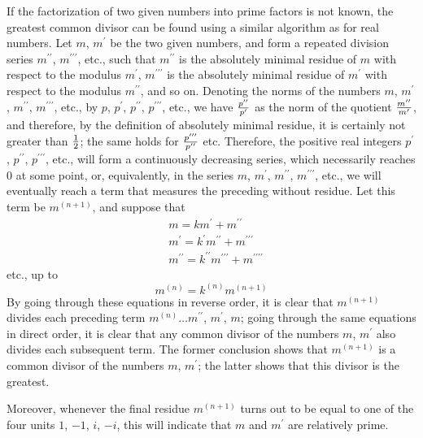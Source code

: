 \documentclass[twoside,12pt]{memoir}
\let\oldfrac\frac
\def\frac#1#2{\mathchoice{\tfrac{#1}{#2}}{\oldfrac{#1}{#2}}{\genfrac{}{}{}{2}{#1}{#2\mathstrut}}{\genfrac{}{}{}{3}{#1}{#2\mathstrut}}}
\begin{document}
If the factorization of two given numbers into prime factors is not known, the greatest common divisor can be found using a similar algorithm as for real numbers. Let \(m\), \(m^{\prime}\) be the two given numbers, and form a repeated division series \(m^{\prime \prime}\), \(m^{\prime \prime \prime}\), etc., such that \(m^{\prime \prime}\) is the absolutely minimal residue of \(m\) with respect to the modulus \(m^{\prime}\), \(m^{\prime \prime \prime}\) is the absolutely minimal residue of \(m^{\prime}\) with respect to the modulus \(m^{\prime \prime}\), and so on. Denoting the norms of the numbers \(m\), \(m^{\prime}\), \(m^{\prime \prime}\), \(m^{\prime \prime \prime}\), etc., by \(p\), \(p^{\prime}\), \(p^{\prime \prime}\), \(p^{\prime \prime \prime}\), etc., we have \(\frac{p^{\prime \prime}}{p^{\prime}}\) as the norm of the quotient \(\frac{m^{\prime \prime}}{m^{\prime}}\), and therefore, by the definition of absolutely minimal residue, it is certainly not greater than \(\frac{1}{2}\); the same holds for \(\frac{p^{\prime \prime \prime}}{p^{\prime \prime}}\) etc. Therefore, the positive real integers \(p^{\prime}\), \(p^{\prime \prime}\), \(p^{\prime \prime \prime}\), etc., will form a continuously decreasing series, which necessarily reaches \(0\) at some point, or, equivalently, in the series \(m\), \(m^{\prime}\), \(m^{\prime \prime}\), \(m^{\prime \prime \prime}\), etc., we will eventually reach a term that measures the preceding without residue. Let this term be \(m^{(n+1)}\), and suppose that
\[\begin{aligned}
& m=k m^{\prime}+m^{\prime \prime} \\
& m^{\prime}=k^{\prime} m^{\prime \prime}+m^{\prime \prime \prime} \\
& m^{\prime \prime}=k^{\prime \prime} m^{\prime \prime \prime}+m^{\prime \prime \prime \prime}
\end{aligned}\]
etc., up to
\[m^{(n)}=k^{(n)} m^{(n+1)}\]
By going through these equations in reverse order, it is clear that \(m^{(n+1)}\) divides each preceding term \(m^{(n)} \ldots m^{\prime \prime}\), \(m^{\prime}\), \(m\); going through the same equations in direct order, it is clear that any common divisor of the numbers \(m\), \(m^{\prime}\) also divides each subsequent term. The former conclusion shows that \(m^{(n+1)}\) is a common divisor of the numbers \(m\), \(m^{\prime}\); the latter shows that this divisor is the greatest.

Moreover, whenever the final residue \(m^{(n+1)}\) turns out to be equal to one of the four units \(1\), \(-1\), \(i\), \(-i\), this will indicate that \(m\) and \(m^{\prime}\) are relatively prime.
%
\end{document}
